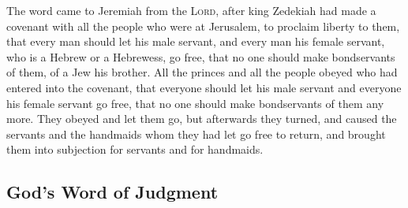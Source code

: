  The word came to Jeremiah from the \textsc{Lord}, after
king Zedekiah had made a covenant with all the people who were at
Jerusalem, to proclaim liberty to them,  that every man
should let his male servant, and every man his female servant, who is a
Hebrew or a Hebrewess, go free, that no one should make bondservants of
them, of a Jew his brother.  All the princes and all the
people obeyed who had entered into the covenant, that everyone should
let his male servant and everyone his female servant go free, that no
one should make bondservants of them any more. They obeyed and let them
go,  but afterwards they turned, and caused the servants
and the handmaids whom they had let go free to return, and brought them
into subjection for servants and for handmaids.

\hypertarget{gods-word-of-judgment}{%
\subsection{God's Word of Judgment}\label{gods-word-of-judgment}}

